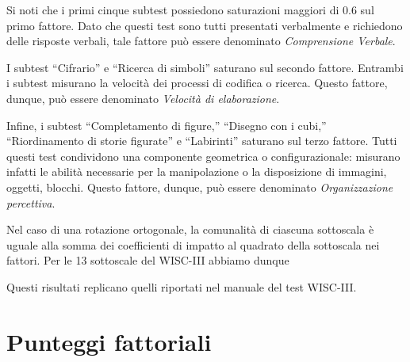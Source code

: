\documentclass[
  11pt,
]{krantz}
\makeatletter
\newenvironment{Shaded}{\begin{snugshade}}{\end{snugshade}}
\newcommand{\CommentTok}[1]{\textcolor[rgb]{0.37,0.37,0.37}{\textit{#1}}}
\newcommand{\ControlFlowTok}[1]{\textcolor[rgb]{0.27,0.27,0.27}{\textbf{#1}}}
\newcommand{\DecValTok}[1]{\textcolor[rgb]{0.06,0.06,0.06}{#1}}
\newcommand{\FunctionTok}[1]{\textcolor[rgb]{0,0,0}{#1}}
\newcommand{\NormalTok}[1]{#1}
\newcommand{\OtherTok}[1]{\textcolor[rgb]{0.37,0.37,0.37}{#1}}
\newcommand{\SpecialCharTok}[1]{\textcolor[rgb]{0,0,0}{#1}}
\newenvironment{kframe}{%
\medskip{}
\setlength{\fboxsep}{.8em}
 \def\at@end@of@kframe{}%
 \ifinner\ifhmode%
  \def\at@end@of@kframe{\end{minipage}}%
  \begin{minipage}{\columnwidth}%
 \fi\fi%
 \def\FrameCommand##1{\hskip\@totalleftmargin \hskip-\fboxsep
 \colorbox{shadecolor}{##1}\hskip-\fboxsep
     \hskip-\linewidth \hskip-\@totalleftmargin \hskip\columnwidth}%
 \MakeFramed {\advance\hsize-\width
   \@totalleftmargin\z@ \linewidth\hsize
   \@setminipage}}%
 {\par\unskip\endMakeFramed%
 \at@end@of@kframe}
\renewenvironment{Shaded}{\begin{kframe}}{\end{kframe}}
\makeatother
\begin{document}
Si noti che i primi cinque subtest possiedono saturazioni maggiori di \(0.6\) sul primo fattore. Dato che questi test sono tutti presentati verbalmente e richiedono delle risposte verbali, tale fattore può essere denominato \emph{Comprensione Verbale}.

I subtest ``Cifrario'' e ``Ricerca di simboli'' saturano sul secondo fattore. Entrambi i subtest misurano la velocità dei processi di codifica o ricerca. Questo fattore, dunque, può essere denominato \emph{Velocità di elaborazione}.

Infine, i subtest ``Completamento di figure,'' ``Disegno con i cubi,'' ``Riordinamento di storie figurate'' e ``Labirinti'' saturano sul terzo fattore. Tutti questi test condividono una componente geometrica o configurazionale: misurano infatti le abilità necessarie per la manipolazione o la disposizione di immagini, oggetti, blocchi. Questo fattore, dunque, può essere denominato \emph{Organizzazione percettiva}.

Nel caso di una rotazione ortogonale, la comunalità di ciascuna sottoscala è uguale alla somma dei coefficienti di impatto al quadrato della sottoscala nei fattori. Per le 13 sottoscale del WISC-III abbiamo dunque

\begin{Shaded}
\end{Shaded}

Questi risultati replicano quelli riportati nel manuale del test WISC-III.

\hypertarget{punteggi-fattoriali}{%
\section{Punteggi fattoriali}\label{punteggi-fattoriali}}
\end{document}
